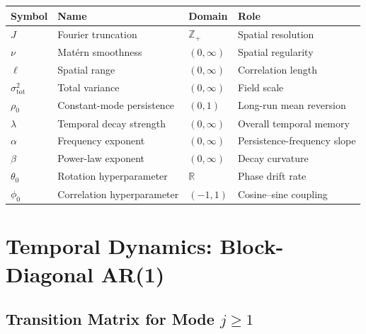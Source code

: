 \documentclass[12pt]{article}
\begin{document}
\begin{center}
\begin{tabular}{@{}llll@{}}
\toprule
\textbf{Symbol} & \textbf{Name} & \textbf{Domain} & \textbf{Role} \\
\midrule
$J$                   & Fourier truncation         & $\mathbb{Z}_+$   & Spatial resolution \\
$\nu$                 & Mat\'{e}rn smoothness      & $(0,\infty)$     & Spatial regularity \\
$\ell$                & Spatial range              & $(0,\infty)$     & Correlation length \\
$\sigma^2_\mathrm{tot}$ & Total variance           & $(0,\infty)$     & Field scale \\
$\rho_0$              & Constant-mode persistence  & $(0,1)$          & Long-run mean reversion \\
$\lambda$             & Temporal decay strength    & $(0,\infty)$     & Overall temporal memory \\
$\alpha$              & Frequency exponent         & $(0,\infty)$     & Persistence-frequency slope \\
$\beta$               & Power-law exponent         & $(0,\infty)$     & Decay curvature \\
$\theta_0$            & Rotation hyperparameter    & $\mathbb{R}$     & Phase drift rate \\
$\phi_0$              & Correlation hyperparameter & $(-1,1)$         & Cosine--sine coupling \\
\bottomrule
\end{tabular}
\end{center}

\section{Temporal Dynamics: Block-Diagonal AR(1)}

\subsection{Transition Matrix for Mode \texorpdfstring{$j \geq 1$}{j >= 1}}
\end{document}
